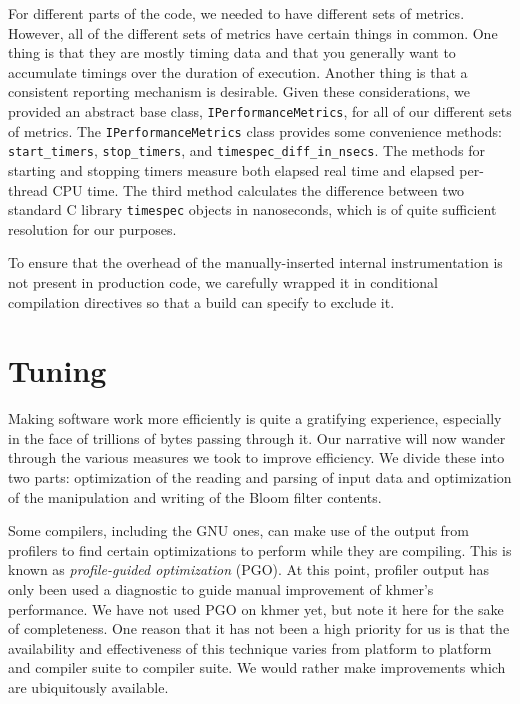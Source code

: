 \documentclass{article}
\begin{document}

For different parts of the code, we needed to have different sets of metrics. However, all of the different sets of metrics have certain things in common. One thing is that they are mostly timing data and that you generally want to accumulate timings over the duration of execution. Another thing is that a consistent reporting mechanism is desirable. Given these considerations, we provided an abstract base class, \texttt{IPerformanceMetrics}, for all of our different sets of metrics. The \texttt{IPerformanceMetrics} class provides some convenience methods: \texttt{start\_timers}, \texttt{stop\_timers}, and \texttt{timespec\_diff\_in\_nsecs}. The methods for starting and stopping timers measure both elapsed real time and elapsed per-thread CPU time. The third method calculates the difference between two standard C library \texttt{timespec} objects in nanoseconds, which is of quite sufficient resolution for our purposes.

To ensure that the overhead of the manually-inserted internal instrumentation is not present in production code, we carefully wrapped it in conditional compilation directives so that a build can specify to exclude it.

\section{Tuning}

Making software work more efficiently is quite a gratifying experience, especially in the face of trillions of bytes passing through it. Our narrative will now wander through the various measures we took to improve efficiency. We divide these into two parts: optimization of the reading and parsing of input data and optimization of the manipulation and writing of the Bloom filter contents.

Some compilers, including the GNU ones, can make use of the output from profilers to find certain optimizations to perform while they are compiling. This is known as \textit{profile-guided optimization} (PGO). At this point, profiler output has only been used a diagnostic to guide manual improvement of khmer's performance. We have not used PGO on khmer yet, but note it here for the sake of completeness. One reason that it has not been a high priority for us is that the availability and effectiveness of this technique varies from platform to platform and compiler suite to compiler suite. We would rather make improvements which are ubiquitously available.
\end{document}
